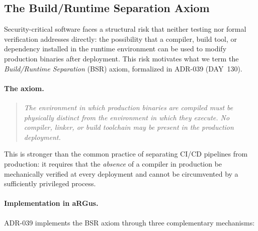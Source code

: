 \documentclass[11pt,a4paper]{article}
\begin{document}
    \subsection{The Build/Runtime Separation Axiom}
    \label{subsec:bsr-axiom}

    Security-critical software faces a structural risk that neither testing nor
    formal verification addresses directly: the possibility that a compiler, build
    tool, or dependency installed in the runtime environment can be used to modify
    production binaries after deployment. This risk motivates what we term the
    \emph{Build/Runtime Separation} (BSR) axiom, formalized in ADR-039 (DAY~130).

    \paragraph{The axiom.}
    \begin{quote}
        \emph{The environment in which production binaries are compiled must be
        physically distinct from the environment in which they execute. No compiler,
            linker, or build toolchain may be present in the production deployment.}
    \end{quote}

    This is stronger than the common practice of separating CI/CD pipelines from
    production: it requires that the \emph{absence} of a compiler in production be
    mechanically verified at every deployment and cannot be circumvented by a
    sufficiently privileged process.

    \paragraph{Implementation in aRGus.}
    ADR-039 implements the BSR axiom through three complementary mechanisms:
\end{document}
